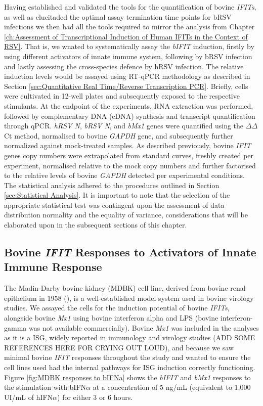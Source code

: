 Having established and validated the tools for the quantification of bovine \textit{IFITs}, as well as elucitaded the optimal assay termination time points for bRSV infections we then had all the tools required to mirror the analysis from Chapter \ref{ch:Assessment of Transcriptional Induction of Human IFITs in the Context of RSV}. That is, we wnated to systematically assay the \textit{bIFIT} induction, firstly by using different activators of innate immune system, following by bRSV infection and lastly assessing the cross-species defence by hRSV infection. The relative induction levels would be assayed using RT-qPCR methodology as described in Section \ref{sec:Quantitative Real Time/Reverse Transcription PCR}. Briefly, cells were cultivated in 12-well plates and subsequently exposed to the respective stimulants. At the endpoint of the experiments, RNA extraction was performed, followed by complementary DNA (cDNA) synthesis and transcript quantification through qPCR. \textit{hRSV N}, \textit{bRSV N}, and \textit{bMx1} genes were quantified using the \(\Delta\)\(\Delta\)Ct method, normalised to bovine \textit{GAPDH} gene, and subsequently further normalized against mock-treated samples. As described previously, bovine \textit{IFIT} genes copy numbers were extrapolated from standard curves, freshly created per experiment, normalised relative to the mock copy numbers and further factorised to the relative levels of bovine \textit{GAPDH} detected per experimental conditions. The statistical analysis adhered to the procedures outlined in Section \ref{sec:Statistical Analysis}. It is important to note that the selection of the appropriate statistical test was contingent upon the assessment of data distribution normality and the equality of variance, considerations that will be elaborated upon in the subsequent sections of this chapter.

\subsection{Bovine \textit{IFIT} Responses to Activators of Innate Immune Response} \label{subsec:Bovine IFIT Responses to Activators of Innate Immune Response}
The Madin-Darby bovine kidney (MDBK) cell line, derived from bovine renal epithelium in 1958 (\cite{Madin1958EstablishedOrigin}), is a well-established model system used in bovine virology studies. We assayed the cells for the induction potential of bovine \textit{IFITs}, alongside bovine \textit{Mx1} using bovine interferon alpha and LPS (bovine interferon-gamma was not available commercially). Bovine \textit{Mx1} was included in the analyses as it is a ISG, widely reported in immunology and virology studies (ADD SOME REFERENCES HERE FOR CRYING OUT LOUD), and because we saw minimal bovine \textit{IFIT} responses throughout the study and wanted to ensure the cell lines used had the internal pathways for ISG induction correctly functioning. Figure \ref{fig:MDBK responses to bIFNa} shows the \textit{bIFIT} and \textit{bMx1} responses to the stimulation with bIFN\(\alpha\) at a concentration of 5 ng/mL (equivalent to 1,000 UI/mL of hIFN\(\alpha\)) for either 3 or 6 hours.

